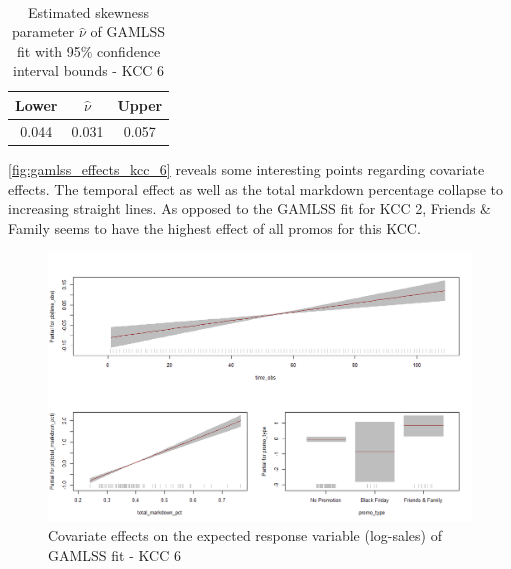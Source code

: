 \begin{table}[H]
\setlength\arrayrulewidth{1pt}  
\centering
\begin{adjustbox}{max width=\textwidth}\
\begin{tabular}{c|c|c}
\hline
\rowcolor{white} 
\textbf{Lower} & $\hat{\nu}$ & \textbf{Upper} \\ \hline\hline
0.044        & 0.031           & 0.057        \\ \hline
\end{tabular}
\end{adjustbox}
\caption{Estimated skewness parameter $\hat{\nu}$ of GAMLSS fit with 95\% confidence interval bounds - KCC 6}
\label{tab:nu_ci_kcc_6}
\end{table}




\autoref{fig:gamlss_effects_kcc_6} reveals some interesting points regarding covariate effects. The temporal effect as well as the total markdown percentage collapse to increasing straight lines. 
As opposed to the \ac{GAMLSS} fit for \ac{KCC} 2, Friends \& Family seems to have the highest effect of all promos for this \ac{KCC}. 
\\



\begin{figure}[H]
\centering
  \includegraphics[width=0.95\linewidth]{figures/gamlss_effects_kcc_6.png}
  \caption{Covariate effects on the expected response variable (log-sales) of GAMLSS fit - KCC 6}
  \label{fig:gamlss_effects_kcc_6}
\end{figure}









